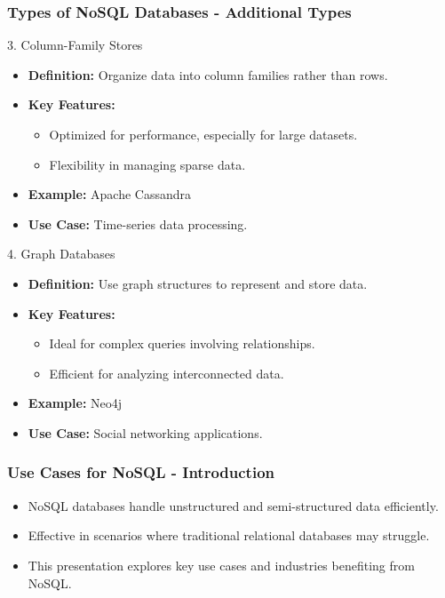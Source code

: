 \documentclass[aspectratio=169]{beamer}
\begin{document}
\begin{frame}[fragile]
    \frametitle{Types of NoSQL Databases - Additional Types}
    \begin{block}{3. Column-Family Stores}
        \begin{itemize}
            \item \textbf{Definition:} Organize data into column families rather than rows.
            \item \textbf{Key Features:}
            \begin{itemize}
                \item Optimized for performance, especially for large datasets.
                \item Flexibility in managing sparse data.
            \end{itemize}
            \item \textbf{Example:} Apache Cassandra
            \item \textbf{Use Case:} Time-series data processing.
        \end{itemize}
    \end{block}
    
    \begin{block}{4. Graph Databases}
        \begin{itemize}
            \item \textbf{Definition:} Use graph structures to represent and store data.
            \item \textbf{Key Features:}
            \begin{itemize}
                \item Ideal for complex queries involving relationships.
                \item Efficient for analyzing interconnected data.
            \end{itemize}
            \item \textbf{Example:} Neo4j
            \item \textbf{Use Case:} Social networking applications.
        \end{itemize}
    \end{block}
\end{frame}

\begin{frame}[fragile]
    \frametitle{Use Cases for NoSQL - Introduction}
    \begin{itemize}
        \item NoSQL databases handle unstructured and semi-structured data efficiently.
        \item Effective in scenarios where traditional relational databases may struggle.
        \item This presentation explores key use cases and industries benefiting from NoSQL.
    \end{itemize}
\end{frame}
\end{document}
